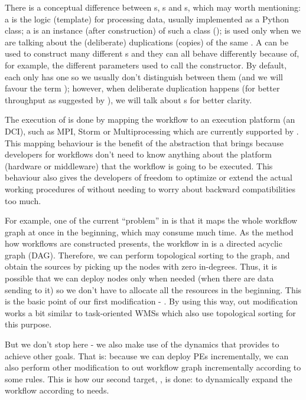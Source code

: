 
There is a conceptual difference between \tPETmpl{}s, \tPEInst{}s and \tPEDup{}s, which may worth mentioning: a \tPETmpl is the logic (template) for processing data, usually implemented as a Python class; a \tPEInst is an instance (after construction) of such a class (\tPETmpl); \tPEDup is used only when we are talking about the (deliberate) duplications (copies) of the same \tPEInst. A \tPETmpl can be used to construct many different \tPEInst{}s and they can all behave differently because of, for example, the different parameters used to call the constructor. By default, each \tPEInst only has one \tPEDup so we usually don't distinguish between them (and we will favour the term \tPEInst); however, when deliberate duplication happens (\eg for better throughput as suggested by \citeauthor{doi:10.1177/1094342016649766} \cite{doi:10.1177/1094342016649766}), we will talk about \tPEDup{}s for better clarity.

The execution of \dpy is done by mapping the workflow to an execution platform (\ie an DCI), such as MPI, Storm or Multiprocessing which are currently supported by \dpy. This mapping behaviour is the benefit of the abstraction that \dpy brings because developers for workflows don't need to know anything about the platform (\eg hardware or middleware) that the workflow is going to be executed. This behaviour also gives the developers of \dpy freedom to optimize or extend the actual working procedures of \dpy without needing to worry about backward compatibilities too much.

For example, one of the current ``problem'' in \dpy is that it maps the whole workflow graph at once in the beginning, which may consume much time. As the method how workflows are constructed presents, the workflow in \dpy is a directed acyclic graph (DAG). Therefore, we can perform topological sorting to the graph, and obtain the sources by picking up the nodes with zero in-degrees. Thus, it is possible that we can deploy nodes only when needed (\eg when there are data sending to it) so we don't have to allocate all the resources in the beginning. This is the basic point of our first modification - \tincdep. By using this way, out modification works a bit similar to task-oriented WMSs which also use topological sorting for this purpose.

But we don't stop here - we also make use of the dynamics that \tincdep provides to achieve other goals. That is: because we can deploy PEs incrementally, we can also perform other modification to out workflow graph incrementally according to some rules. This is how our second target, \tdynexp, is done: to dynamically expand the workflow according to needs.

